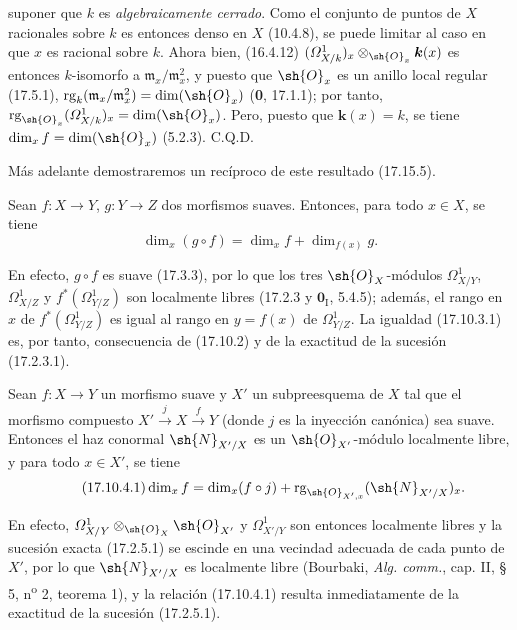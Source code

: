 
suponer que $k$ es \emph{algebraicamente cerrado}. Como el conjunto de puntos de $X$ racionales sobre $k$ es entonces denso en $X$ (10.4.8), se puede limitar al caso en que $x$ es racional sobre $k$. Ahora bien, (16.4.12) $(\varOmega^1_{X/k})_x\otimes_{\sh{O}_x}\boldsymbol{k}(x)$ es entonces $k$-isomorfo a $\mathfrak m_x/\mathfrak m_x^2$, y puesto que $\sh{O}_x$ es un anillo local regular (17.5.1), $\operatorname{rg}_k(\mathfrak m_x/\mathfrak m_x^2)=\dim(\sh{O}_x)$ (\textbf 0, 17.1.1); por tanto, $\operatorname{rg}_{\sh{O}_x}(\varOmega^1_{X/k})_x=\dim(\sh{O}_x)$. Pero, puesto que $\boldsymbol{k}(x)=k$, se tiene $\dim_x f=\dim(\sh{O}_x)$ (5.2.3). C.Q.D.

Más adelante demostraremos un recíproco de este resultado (17.15.5).

\begin{corollary}[17.10.3]
\label{IV.17.10.3}
Sean $f:X\to Y$, $g:Y\to Z$ dos morfismos suaves. Entonces, para todo $x\in X$, se tiene
\begin{equation}
\label{IV.17.10.3.1}
\tag{17.10.3.1}
\dim_x(g\circ f)=\dim_x f+\dim_{f(x)}g.
\end{equation}
\end{corollary}

En efecto, $g\circ f$ es suave (17.3.3), por lo que los tres $\sh{O}_X$-módulos $\varOmega^1_{X/Y}$, $\varOmega^1_{X/Z}$ y $f^*(\varOmega^1_{Y/Z})$ son localmente libres (17.2.3 y $\mathbf{0}_{\mathrm I}$, 5.4.5); además, el rango en $x$ de $f^*(\varOmega^1_{Y/Z})$ es igual al rango en $y=f(x)$ de $\varOmega^1_{Y/Z}$. La igualdad (17.10.3.1) es, por tanto, consecuencia de (17.10.2) y de la exactitud de la sucesión (17.2.3.1).

\begin{corollary}[17.10.4]
\label{IV.17.10.4}
Sean $f:X\to Y$ un morfismo suave y $X'$ un subpreesquema de $X$ tal que el morfismo compuesto $X'\xrightarrow{j}X\xrightarrow{f}Y$ (donde $j$ es la inyección canónica) sea suave. Entonces el haz conormal $\sh{N}_{X'/X}$ es un $\sh{O}_{X'}$-módulo localmente libre, y para todo $x\in X'$, se tiene
\begin{equation}
\label{IV.17.10.4.1}
\tag{17.10.4.1}
\dim_x f=\dim_x(f\circ j)+\operatorname{rg}_{\sh{O}_{X',x}}(\sh{N}_{X'/X})_x.
\end{equation}
\end{corollary}

En efecto, $\varOmega^1_{X/Y}\otimes_{\sh{O}_X}\sh{O}_{X'}$ y $\varOmega^1_{X'/Y}$ son entonces localmente libres y la sucesión exacta (17.2.5.1) se escinde en una vecindad adecuada de cada punto de $X'$, por lo que $\sh{N}_{X'/X}$ es localmente libre (Bourbaki, \emph{Alg. comm.}, cap. II, § 5, n\textsuperscript{o} 2, teorema 1), y la relación (17.10.4.1) resulta inmediatamente de la exactitud de la sucesión (17.2.5.1).
